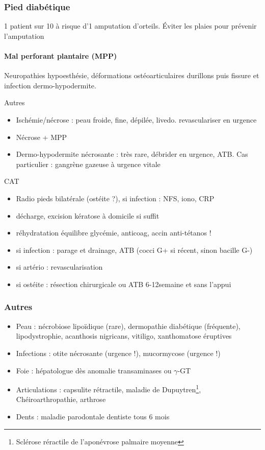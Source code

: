 \documentclass{book}
\begin{document}
\subsubsection{Pied diabétique}
\label{sec:org218745e}
1 patient sur 10 à risque d'1 amputation d'orteils. Éviter les plaies pour prévenir l'amputation
\faBomb
\paragraph{Mal perforant plantaire (MPP)}
\label{sec:org6d60032}
Neuropathies \thus hypoesthésie, déformations ostéoarticulaires \thus durillons
puis fissure et infection \thus dermo-hypodermite.

Autres
\begin{itemize}
\item Ischémie/nécrose : peau froide, fine, dépilée, livedo. \thus revasculariser en urgence \faBomb
\item Nécrose + MPP
\item Dermo-hypodermite nécrosante : très rare, \thus débrider en urgence, ATB. 
Cas particulier : gangrène gazeuse à  \thus urgence vitale \danger
\end{itemize}

CAT
\begin{itemize}
\item Radio pieds bilatérale (ostéite ?), si infection : NFS, iono, CRP
\item décharge, excision kératose à domicile si suffit
\item réhydratation \textpm{} équilibre glycémie, anticoag, accin anti-tétanos !
\item si infection : parage et drainage, ATB (cocci G+ si récent, sinon bacille G-)
\item si artério : revascularisation
\item si ostéite : résection chirurgicale ou ATB 6-12semaine et sans l'appui
\end{itemize}

\subsubsection{Autres}
\label{sec:org89c11d1}
\begin{itemize}
\item Peau : nécrobiose lipoïdique (rare), dermopathie diabétique (fréquente),
lipodystrophie, acanthosis nigricans, vitiligo, xanthomatose éruptives
\item Infections : otite nécrosante (urgence !), mucormycose (urgence !)
\item Foie : hépatologue dès anomalie transaminases ou \(\gamma\)-GT
\item Articulations : capsulite rétractile, maladie de Dupuytren\footnote{Sclérose réractile de l'aponévrose palmaire moyenne}, Chéiroarthropathie, arthrose
\item Dents : maladie parodontale \thus dentiste tous 6 mois
\end{itemize}
\end{document}
